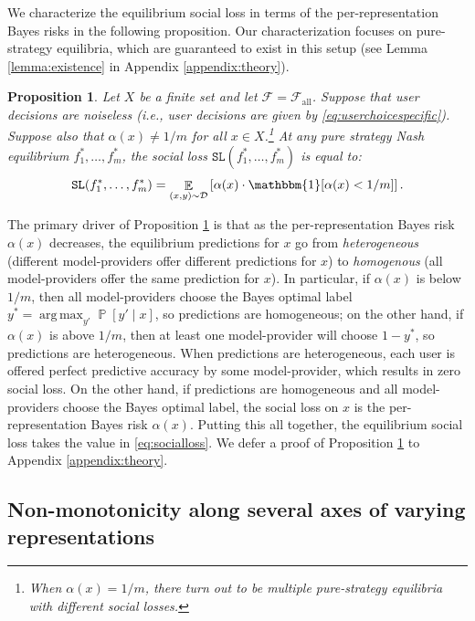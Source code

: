 \documentclass[letterpaper,11pt]{article}
\newtheorem{proposition}{Proposition}
\theoremstyle{plain}
\DeclareMathOperator*{\argmax}{arg\,max}
\DeclareMathOperator*{\E}{\mathbb{E}}
\DeclareMathOperator*{\Prob}{\mathbb{P}}
\begin{document}
We characterize the equilibrium social loss in terms of the per-representation Bayes risks in the following proposition. Our characterization focuses on  pure-strategy equilibria, which are guaranteed to exist in this setup (see Lemma \ref{lemma:existence} in Appendix \ref{appendix:theory}).
\begin{proposition}
\label{prop:idealized}
Let $X$ be a finite set and let $\mathcal{F} = \mathcal{F}_{\text{all}}$. Suppose that user decisions are noiseless (i.e., user decisions are given by \eqref{eq:userchoicespecific}). 
Suppose also that $\alpha(x) \neq 1/m$ for all $x \in X$.\footnote{When $\alpha(x) = 1/m$, there turn out to be multiple pure-strategy equilibria with different social losses.} 
At any pure strategy Nash equilibrium $f^*_1, \ldots, f^*_m$, the social loss $\texttt{SL}(f^*_1, \ldots, f^*_m)$ is equal to:
\begin{equation}
\label{eq:socialloss} 
\texttt{SL}(f^*_1, \ldots, f^*_m) =  \E_{(x,y) \sim \mathcal{D}} \left[\alpha(x) \cdot \mathbbm{1}[\alpha(x) < 1/m] \right]. 
\end{equation}
\end{proposition}
\noindent The primary driver of Proposition \ref{prop:idealized} 
is that as the per-representation Bayes risk $\alpha(x)$ decreases, the equilibrium predictions for $x$ go from \textit{heterogeneous} (different model-providers offer different predictions for $x$) to \textit{homogenous} (all model-providers offer the same prediction for $x$). In particular, if $\alpha(x)$ is below $1/m$, then all model-providers choose the Bayes optimal label $y^* = \argmax_{y'} \Prob[y' \mid x]$, so predictions are homogeneous; on the other hand, if $\alpha(x)$ is above $1/m$, then at least one model-provider will choose $1- y^*$, so predictions are heterogeneous. 
When predictions are heterogeneous, each user is offered perfect predictive accuracy by some model-provider, which results in zero social loss. On the other hand, if predictions are homogeneous and all model-providers choose the Bayes optimal label, the social loss on $x$ is the per-representation Bayes risk $\alpha(x)$. Putting this all together, the equilibrium social loss takes the value in \eqref{eq:socialloss}. We defer a proof of Proposition \ref{prop:idealized} to Appendix \ref{appendix:theory}.


\subsection{Non-monotonicity along several axes of varying representations}\label{subsec:examples}
\end{document}
